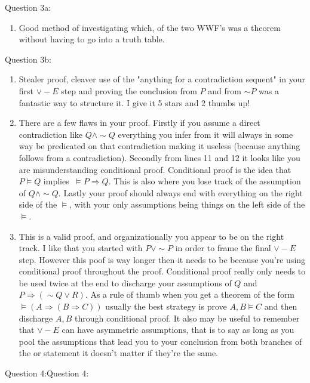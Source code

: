 \documentclass[11pt] {article}
\begin{document}
Question 3a:
\begin{enumerate}
\item Good method of investigating which, of the two WWF's was a theorem without having to go into a truth table.
\end{enumerate}
Question 3b:
\begin{enumerate}
\item Stealer proof, cleaver use of the "anything for a contradiction sequent" in your first $\lor -E$ step and proving the conclusion from $P$ and from $\sim P$ was a fantastic way to structure it. I give it 5 stars and 2 thumbs up!
\item There are a few flaws in your proof. Firstly if you assume a direct contradiction like $Q\land \sim Q$ everything you infer from it will always in some way be predicated on that contradiction making it useless (because anything follows from a contradiction). Secondly from lines 11 and 12 it looks like you are misunderstanding conditional proof. Conditional proof is the idea that $P \vDash Q$ implies $\ \vDash P \Rightarrow Q$. This is also where you lose track of the assumption of $Q\land \sim Q$. Lastly your proof should always end with everything on the right side of the $\vDash$, with your only assumptions being things on the left side of the $\vDash$.
\item This is a valid proof, and organizationally you appear to be on the right track. I like that you started with $P \lor \sim P$ in order to frame the final $\lor-E$ step. However this poof is way longer then it needs to  be because you're using conditional proof throughout the proof. Conditional proof really only needs to be used twice at the end to discharge your assumptions of $Q$ and $P \Rightarrow (\sim Q \lor R)$. As a rule of thumb when you get a theorem of the form $\vDash (A \Rightarrow (B \Rightarrow C))$ usually the best strategy is prove $A,B \vDash C$ and then discharge $A,B$ through conditional proof. It also may be useful to remember that $\lor -E$ can have asymmetric assumptions, that is to say as long as you pool the assumptions that lead you to your conclusion from both branches of the or statement it doesn't matter if they're the same. 
\end{enumerate}
Question 4:Question 4:
\end{document}
